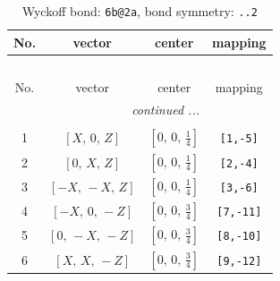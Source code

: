\documentclass[fleqn,8pt]{jsarticle}
\begin{document}
\begin{longtable}{cccc}
\caption{Wyckoff bond: {\tt 6b@2a}, bond symmetry: {\tt ..2}}
 \\
 \hline \hline
No. & vector & center & mapping \\ \hline \endfirsthead

\multicolumn{3}{l}{\tablename\ \thetable{}} \\
 \hline \hline
No. & vector & center & mapping \\ \hline \endhead

 \hline \hline
\multicolumn{3}{r}{\footnotesize\it continued ...} \\ \endfoot

 \hline \hline
\multicolumn{3}{r}{} \\ \endlastfoot

1 & $\left[ X,\, 0,\, Z \right]$ & $\left[ 0,\, 0,\, \frac{1}{4} \right]$ & {\tt [1,-5]} \\ \hline
2 & $\left[ 0,\, X,\, Z \right]$ & $\left[ 0,\, 0,\, \frac{1}{4} \right]$ & {\tt [2,-4]} \\ \hline
3 & $\left[ - X,\, - X,\, Z \right]$ & $\left[ 0,\, 0,\, \frac{1}{4} \right]$ & {\tt [3,-6]} \\ \hline
4 & $\left[ - X,\, 0,\, - Z \right]$ & $\left[ 0,\, 0,\, \frac{3}{4} \right]$ & {\tt [7,-11]} \\ \hline
5 & $\left[ 0,\, - X,\, - Z \right]$ & $\left[ 0,\, 0,\, \frac{3}{4} \right]$ & {\tt [8,-10]} \\ \hline
6 & $\left[ X,\, X,\, - Z \right]$ & $\left[ 0,\, 0,\, \frac{3}{4} \right]$ & {\tt [9,-12]} \\
\end{longtable}
\renewcommand{\arraystretch}{1.2}
\end{document}
